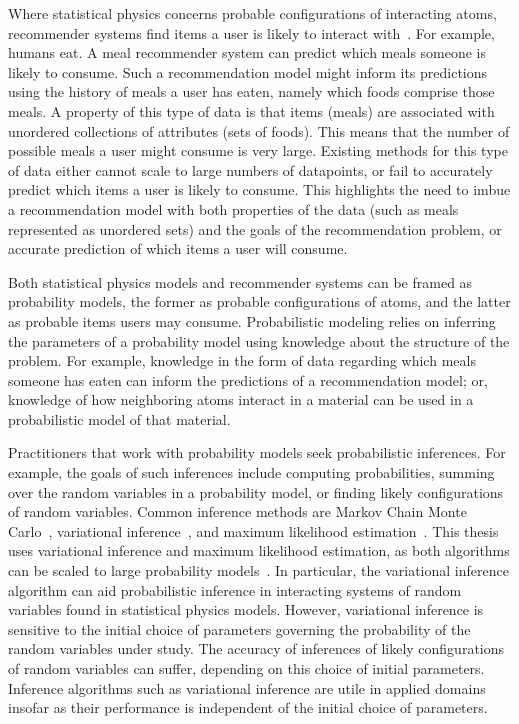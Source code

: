 Where statistical physics concerns probable configurations of interacting atoms, recommender systems find items a user is likely to interact with~\citep{koren2009matrix}. For example, humans eat. A meal recommender system can predict which meals someone is likely to consume. Such a recommendation model might inform its predictions using the history of meals a user has eaten, namely which foods comprise those meals. A property of this type of data is that items (meals) are associated with unordered collections of attributes (sets of foods). This means that the number of possible meals a user might consume is very large. Existing methods for this type of data either cannot scale to large numbers of datapoints, or fail to accurately predict which items a user is likely to consume. This highlights the need to imbue a recommendation model with both properties of the data (such as meals represented as unordered sets) and the goals of the recommendation problem, or accurate prediction of which items a user will consume.

Both statistical physics models and recommender systems can be framed as probability models, the former as probable configurations of atoms, and the latter as probable items users may consume. Probabilistic modeling relies on inferring the parameters of a probability model using knowledge about the structure of the problem. For example, knowledge in the form of data regarding which meals someone has eaten can inform the predictions of a recommendation model; or, knowledge of how neighboring atoms interact in a material can be used in a probabilistic model of that material.

Practitioners that work with probability models seek probabilistic inferences. For example, the goals of such inferences include computing probabilities, summing over the random variables in a probability model, or finding likely configurations of random variables. Common inference methods are Markov Chain Monte Carlo~\citep{metropolis1953equation}, variational inference~\citep{blei2017variational}, and maximum likelihood estimation~\citep{bishop2006pattern}. This thesis uses variational inference and maximum likelihood estimation, as both algorithms can be scaled to large probability models~\citep{hoffman2013stochastic,robbins1951a-stochastic}. In particular, the variational inference algorithm can aid probabilistic inference in interacting systems of random variables found in statistical physics models. However, variational inference is sensitive to the initial choice of parameters governing the probability of the random variables under study. The accuracy of inferences of likely configurations of random variables can suffer, depending on this choice of initial parameters. Inference algorithms such as variational inference are utile in applied domains insofar as their performance is independent of the initial choice of parameters.


